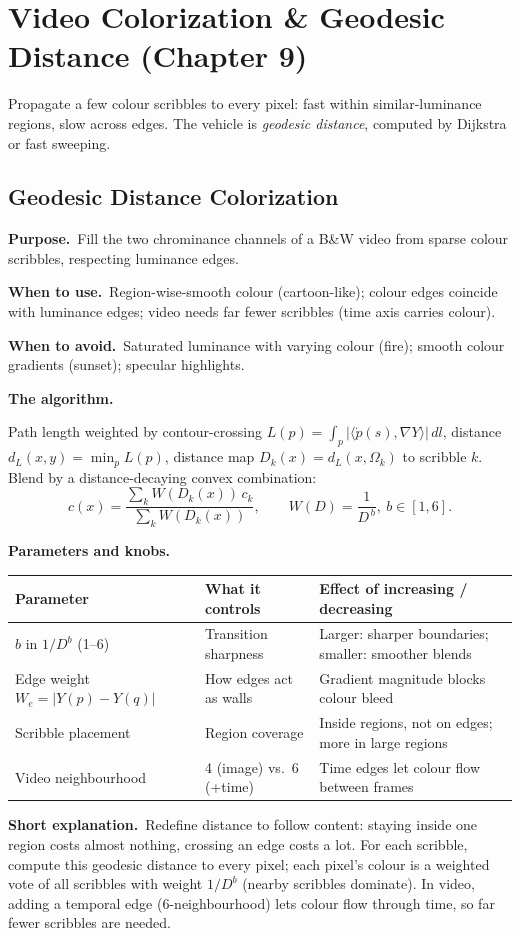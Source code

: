 \documentclass[10pt]{article}
\makeatletter
\newcommand{\Purpose}{\par\smallskip\textbf{Purpose.}\ }
\newcommand{\WhenUse}{\par\textbf{When to use.}\ }
\newcommand{\WhenAvoid}{\par\textbf{When to avoid.}\ }
\newcommand{\TheAlgo}{\par\smallskip\textbf{The algorithm.}\par\nopagebreak}
\newcommand{\Knobs}{\par\smallskip\textbf{Parameters and knobs.}\par\nopagebreak}
\newcommand{\ShortExp}{\par\smallskip\textbf{Short explanation.}\ }
\newenvironment{ptable}{\begin{center}\small\begin{tabular}{@{}p{2.5cm} p{5.9cm} p{6.2cm}@{}}\toprule
Parameter & What it controls & Effect of increasing / decreasing \\ \midrule}
{\bottomrule\end{tabular}\end{center}}
\makeatother
\begin{document}
\newpage
\section{Video Colorization \& Geodesic Distance (Chapter 9)}
Propagate a few colour scribbles to every pixel: fast within similar-luminance regions, slow across edges.
The vehicle is \emph{geodesic distance}, computed by Dijkstra or fast sweeping.

\subsection{Geodesic Distance Colorization}\label{sub:colorize}
\Purpose Fill the two chrominance channels of a B\&W video from sparse colour scribbles, respecting
luminance edges.
\WhenUse Region-wise-smooth colour (cartoon-like); colour edges coincide with luminance edges; video needs
far fewer scribbles (time axis carries colour).
\WhenAvoid Saturated luminance with varying colour (fire); smooth colour gradients (sunset); specular
highlights.
\TheAlgo Path length weighted by contour-crossing
$L(p)=\int_p|\langle\dot p(s),\nabla Y\rangle|\,dl$, distance $d_L(x,y)=\min_p L(p)$, distance map
$D_k(x)=d_L(x,\Omega_k)$ to scribble $k$. Blend by a distance-decaying convex combination:
\[
c(x)=\frac{\sum_k W(D_k(x))\,c_k}{\sum_k W(D_k(x))},\qquad W(D)=\frac{1}{D^{\,b}},\ b\in[1,6].
\]

\begin{algorithm}[H]
\SetAlgoLined
{}
\caption{Geodesic colorization}
\end{algorithm}

\Knobs
\begin{ptable}
$b$ in $1/D^b$ (1--6) & Transition sharpness & Larger: sharper boundaries; smaller: smoother blends \\
Edge weight $W_e=|Y(p)-Y(q)|$ & How edges act as walls & Gradient magnitude blocks colour bleed \\
Scribble placement & Region coverage & Inside regions, not on edges; more in large regions \\
Video neighbourhood & 4 (image) vs.\ 6 (+time) & Time edges let colour flow between frames \\
\end{ptable}
\ShortExp Redefine distance to follow content: staying inside one region costs almost nothing, crossing an
edge costs a lot. For each scribble, compute this geodesic distance to every pixel; each pixel's colour is a
weighted vote of all scribbles with weight $1/D^b$ (nearby scribbles dominate). In video, adding a temporal
edge (6-neighbourhood) lets colour flow through time, so far fewer scribbles are needed.
\end{document}
